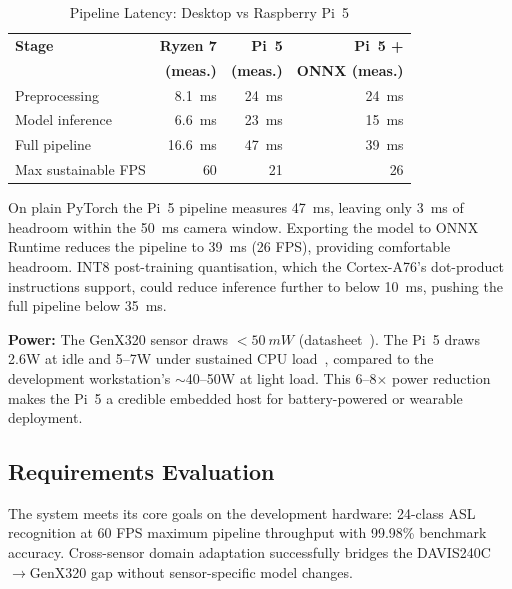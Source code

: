 \documentclass[journal]{IEEEtran}
\begin{document}
\begin{table}[H]
    \centering
    \caption{Pipeline Latency: Desktop vs Raspberry Pi~5}
    \label{tab:latency}
    \setlength{\tabcolsep}{3.5pt}
    \begin{tabular}{lrrr}
        \toprule
        \textbf{Stage} & \textbf{Ryzen 7} & \textbf{Pi~5} & \textbf{Pi~5 +} \\
                       & \textbf{(meas.)} & \textbf{(meas.)} & \textbf{ONNX (meas.)} \\
        \midrule
        Preprocessing          & \SI{8.1}{ms}  & \SI{24}{ms} & \SI{24}{ms} \\
        Model inference        & \SI{6.6}{ms}  & \SI{23}{ms} & \SI{15}{ms} \\
        \midrule
        Full pipeline          & \SI{16.6}{ms} & \SI{47}{ms} & \SI{39}{ms} \\
        Max sustainable FPS    & 60            & 21          & 26          \\
        \bottomrule
    \end{tabular}
\end{table}

On plain PyTorch the Pi~5 pipeline measures \SI{47}{ms}, leaving only \SI{3}{ms} of headroom within the \SI{50}{ms} camera window. Exporting the model to ONNX Runtime reduces the pipeline to \SI{39}{ms} (26 FPS), providing comfortable headroom. INT8 post-training quantisation, which the Cortex-A76's dot-product instructions support, could reduce inference further to below \SI{10}{ms}, pushing the full pipeline below \SI{35}{ms}.

\textbf{Power:} The GenX320 sensor draws $<\SI{50}{mW}$ (datasheet~\cite{prophesee2023}). The Pi~5 draws 2.6W at idle and 5--7W under sustained CPU load~\cite{geerling2023}, compared to the development workstation's ${\sim}$40--50W at light load. This 6--8$\times$ power reduction makes the Pi~5 a credible embedded host for battery-powered or wearable deployment.

\subsection{Requirements Evaluation}

The system meets its core goals on the development hardware: 24-class ASL recognition at 60 FPS maximum pipeline throughput with 99.98\% benchmark accuracy. Cross-sensor domain adaptation successfully bridges the DAVIS240C$\to$GenX320 gap without sensor-specific model changes.
\end{document}
